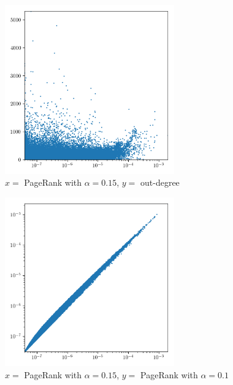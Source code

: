 \documentclass{article}
\begin{document}
\begin{figure}[H]
    \centering
    \includegraphics[width=0.65\textwidth]{plots/2.png}
    \caption{$x =$ PageRank with $\alpha = 0.15$, $y = $ out-degree}
    \label{fig:2}
\end{figure}

\begin{figure}[H]
    \centering
    \includegraphics[width=0.65\textwidth]{plots/3.png}
    \caption{$x =$ PageRank with $\alpha = 0.15$, $y = $ PageRank with $\alpha = 0.1$}
    \label{fig:3}
\end{figure}
\end{document}
